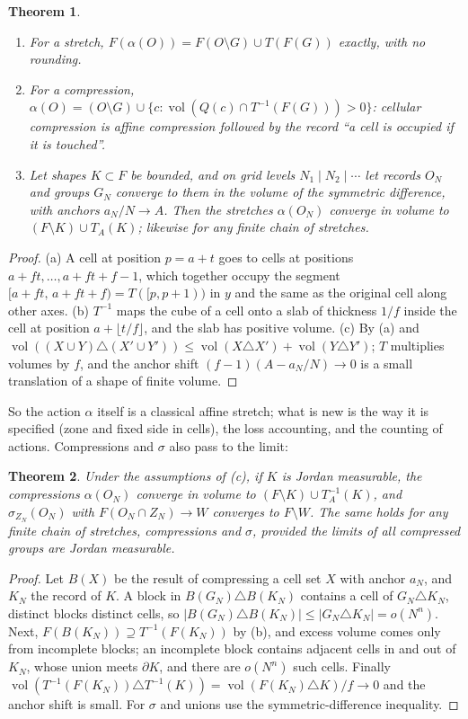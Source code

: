 \documentclass[11pt,a4paper]{article}
\theoremstyle{plain}
\newtheorem{theorem}{Theorem}
\theoremstyle{definition}
\theoremstyle{remark}
\DeclareMathOperator{\vol}{vol}
\begin{document}
\begin{theorem}\label{thm:affine}
\begin{enumerate}[label=\upshape(\alph*)]
\item For a stretch, $F(\alpha(O))=F(O\setminus G)\cup T(F(G))$ exactly, with no rounding.
\item For a compression, $\alpha(O)=(O\setminus G)\cup\{c: \vol(Q(c)\cap T^{-1}(F(G)))>0\}$: cellular compression is affine compression followed by the record ``a cell is occupied if it is touched''.
\item Let shapes $K\subset F$ be bounded, and on grid levels $N_1\mid N_2\mid\cdots$ let records $O_N$ and groups $G_N$ converge to them in the volume of the symmetric difference, with anchors $a_N/N\to A$. Then the stretches $\alpha(O_N)$ converge in volume to $(F\setminus K)\cup T_A(K)$; likewise for any finite chain of stretches.
\end{enumerate}
\end{theorem}
\begin{proof}
(a) A cell at position $p=a+t$ goes to cells at positions $a+ft,\dots,a+ft+f-1$, which together occupy the segment $[a+ft,\,a+ft+f)=T([p,p+1))$ in $y$ and the same as the original cell along other axes. (b) $T^{-1}$ maps the cube of a cell onto a slab of thickness $1/f$ inside the cell at position $a+\lfloor t/f\rfloor$, and the slab has positive volume. (c) By (a) and $\vol((X\cup Y)\triangle(X'\cup Y'))\le\vol(X\triangle X')+\vol(Y\triangle Y')$; $T$ multiplies volumes by $f$, and the anchor shift $(f-1)(A-a_N/N)\to0$ is a small translation of a shape of finite volume.
\end{proof}

So the action $\alpha$ itself is a classical affine stretch; what is new is the way it is specified (zone and fixed side in cells), the loss accounting, and the counting of actions. Compressions and $\sigma$ also pass to the limit:

\begin{theorem}\label{thm:limit}
Under the assumptions of (c), if $K$ is Jordan measurable, the compressions $\alpha(O_N)$ converge in volume to $(F\setminus K)\cup T_A^{-1}(K)$, and $\sigma_{Z_N}(O_N)$ with $F(O_N\cap Z_N)\to W$ converges to $F\setminus W$. The same holds for any finite chain of stretches, compressions and $\sigma$, provided the limits of all compressed groups are Jordan measurable.
\end{theorem}
\begin{proof}
Let $B(X)$ be the result of compressing a cell set $X$ with anchor $a_N$, and $K_N$ the record of $K$. A block in $B(G_N)\triangle B(K_N)$ contains a cell of $G_N\triangle K_N$, distinct blocks distinct cells, so $|B(G_N)\triangle B(K_N)|\le|G_N\triangle K_N|=o(N^n)$. Next, $F(B(K_N))\supseteq T^{-1}(F(K_N))$ by (b), and excess volume comes only from incomplete blocks; an incomplete block contains adjacent cells in and out of $K_N$, whose union meets $\partial K$, and there are $o(N^n)$ such cells. Finally $\vol(T^{-1}(F(K_N))\triangle T^{-1}(K))=\vol(F(K_N)\triangle K)/f\to0$ and the anchor shift is small. For $\sigma$ and unions use the symmetric-difference inequality.
\end{proof}
\end{document}
